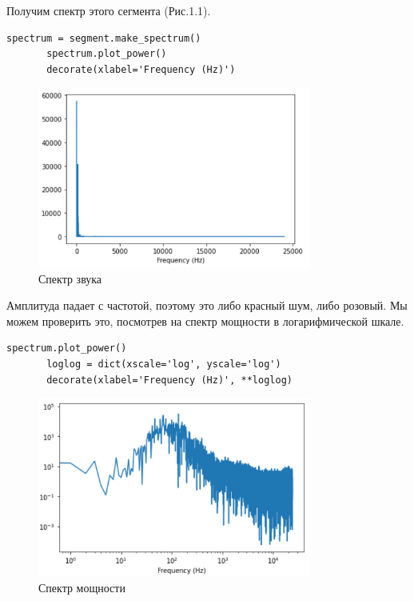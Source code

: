 \documentclass[a4paper,12pt]{report}
\begin{document}
    Получим спектр этого сегмента (Рис.1.1).
\begin{lstlisting}[caption=Получение спектра]
       spectrum = segment.make_spectrum()
       spectrum.plot_power()
       decorate(xlabel='Frequency (Hz)')
\end{lstlisting}
\begin{figure}[H]
        \centering
        \includegraphics[width=0.8\textwidth]{fig1-1.PNG}
        \caption{Спектр звука}
        \label{fig:fig1-1}
\end{figure} 
    
    Амплитуда падает с частотой, поэтому это либо красный шум, либо розовый. Мы можем проверить это, посмотрев на спектр мощности в логарифмической шкале.
\begin{lstlisting}[caption=Получение спектра в логарифмической шкале]
       spectrum.plot_power()
       loglog = dict(xscale='log', yscale='log')
       decorate(xlabel='Frequency (Hz)', **loglog)
\end{lstlisting}
\begin{figure}[H]
        \centering
        \includegraphics[width=0.8\textwidth]{fig1-2.PNG}
        \caption{Спектр мощности}
        \label{fig:fig1-2}
\end{figure}
    
\end{document}
